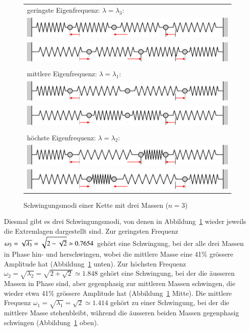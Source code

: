 \begin{figure}
\begin{center}
\begin{tabular}{l}
geringste Eigenfrequenz: $\lambda=\lambda_3$:\\
\includegraphics[width=\hsize]{images/e-8}\\
\includegraphics[width=\hsize]{images/e-9}\\
\\
mittlere Eigenfrequenz: $\lambda=\lambda_1$:\\
\includegraphics[width=\hsize]{images/e-6}\\
\includegraphics[width=\hsize]{images/e-7}\\
\\
höchste Eigenfrequenz: $\lambda=\lambda_2$:\\
\includegraphics[width=\hsize]{images/e-10}\\
\includegraphics[width=\hsize]{images/e-11}
\end{tabular}
\end{center}
\caption{Schwingungsmodi einer Kette mit drei Massen ($n=3$)\label{n3modi}}
\end{figure}%
Diesmal gibt es drei Schwingungsmodi, von denen in Abbildung~\ref{n3modi}
wieder jeweils die Extremlagen dargestellt sind.
Zur geringsten Frequenz
$\omega_3=\sqrt{\mathstrut\lambda_3}=\sqrt{2-\sqrt{2\mathstrut}}\simeq 0.7654$
gehört eine Schwingung, bei der alle drei Massen in Phase
hin- und herschwingen, wobei die mittlere Masse eine 41\% 
grössere Amplitude hat (Abbildung~\ref{n3modi} unten).
Zur höchsten Frequenz
$\omega_2=\sqrt{\lambda_2}=\sqrt{2+\sqrt{2}}\simeq 1.848$
gehört eine Schwingung, bei der die äusseren Massen in Phase sind,
aber gegenphasig zur mittleren Massen schwingen, die wieder etwa
41\% grössere Amplitude hat (Abbildung~\ref{n3modi} Mitte).
Die mittlere Frequenz $\omega_1=\sqrt{\lambda_1}=\sqrt{2}\simeq 1.414$
gehört zu einer Schwingung, bei der die mittlere Masse stehenbleibt,
während die äusseren beiden Massen gegenphasig schwingen (Abbildung~\ref{n3modi} oben).

